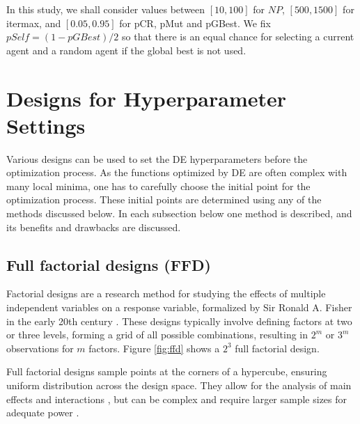 \documentclass [PhD] {package/uclathes}
\begin{document}
In this study, we shall consider values between $[10,  100]$ for $NP$, $[500, 1500]$ for itermax, and $[0.05, 0.95]$ for pCR, pMut and pGBest. We fix $pSelf = (1 - pGBest)/2$ so that there is an equal chance for selecting a current agent and a random agent if the global best is not used.

\section{Designs for Hyperparameter Settings}\label{sec:DE.designs}
Various designs can be used to set the DE hyperparameters before the optimization process. As the functions optimized by DE are often complex with many local minima, one has to carefully choose the initial point for the optimization process. These initial points are determined using any of the methods discussed below. In each subsection below one method is described, and its benefits and drawbacks are discussed.



\subsection*{Full factorial designs (FFD)}
Factorial designs are a research method for studying the effects of multiple independent variables on a response variable, formalized by Sir Ronald A. Fisher in the early 20th century \parencite{fisher1935}. These designs typically involve defining factors at two or three levels, forming a grid of all possible combinations, resulting in \(2^m\) or \(3^m\) observations for \(m\) factors. Figure \ref{fig:ffd} shows a $2^3$ full factorial design.

Full factorial designs sample points at the corners of a hypercube, ensuring uniform distribution across the design space. They allow for the analysis of main effects and interactions \parencite{montgomery2017design}, but can be complex and require larger sample sizes for adequate power \parencite{tabachnick2019}.
\end{document}
